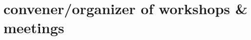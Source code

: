 \documentclass{article}
\begin{document}
\begin{itemize}[leftmargin=*]



\end{itemize}


\section*{\sc  \color{Maroon}  convener/organizer of workshops \& meetings}
\vspace{-.3cm}
\end{document}
